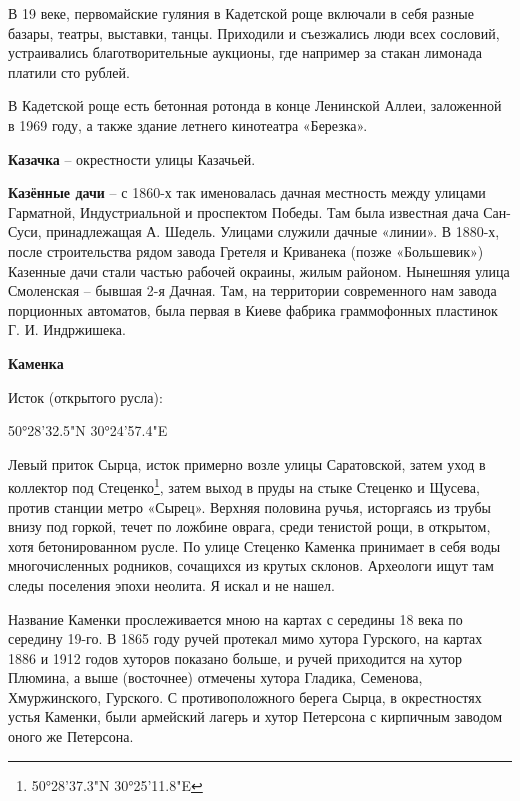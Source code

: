 
В 19 веке, первомайские гуляния в Кадетской роще включали в себя разные базары, театры, выставки, танцы. Приходили и съезжались люди всех сословий, устраивались благотворительные аукционы, где например за стакан лимонада платили сто рублей.

В Кадетской роще есть бетонная ротонда в конце Ленинской Аллеи, заложенной в 1969 году, а также здание летнего кинотеатра «Березка».\\

\medskip

\textbf{Казачка} – окрестности улицы Казачьей.\\

\medskip

\textbf{Казённые дачи} – с 1860-х так именовалась дачная местность между улицами Гарматной, Индустриальной и проспектом Победы. Там была известная дача Сан-Суси, принадлежащая А. Шедель. Улицами служили дачные «линии». В 1880-х, после строительства рядом завода Гретеля и Криванека (позже «Большевик») Казенные дачи стали частью рабочей окраины, жилым районом. Нынешняя улица Смоленская – бывшая 2-я Дачная. Там, на территории современного нам завода порционных автоматов, была первая в Киеве фабрика граммофонных пластинок Г. И. Индржишека.\\

\medskip

\textbf{Каменка}

Исток (открытого русла): 

50°28'32.5"N 30°24'57.4"E

Левый приток Сырца, исток примерно возле улицы Саратовской, затем уход в коллектор под Стеценко\footnote{50°28'37.3"N 30°25'11.8"E}, затем выход в пруды на стыке Стеценко и Щусева, против станции метро «Сырец». Верхняя половина ручья, исторгаясь из трубы внизу под горкой, течет по ложбине оврага, среди тенистой рощи, в открытом, хотя бетонированном русле. По улице Стеценко Каменка принимает в себя воды многочисленных родников, сочащихся из крутых склонов. Археологи ищут там следы поселения эпохи неолита. Я искал и не нашел.

Название Каменки прослеживается мною на картах с середины 18 века по середину 19-го. В 1865 году ручей протекал мимо хутора Гурского, на картах 1886 и 1912 годов хуторов показано больше, и ручей приходится на хутор Плюмина, а выше (восточнее) отмечены хутора Гладика, Семенова, Хмуржинского, Гурского. С противоположного берега Сырца, в окрестностях устья Каменки, были армейский лагерь и хутор Петерсона с кирпичным заводом оного же Петерсона.

